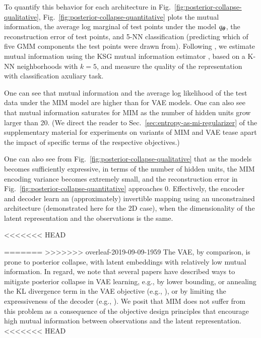 To quantify this behavior for each architecture in  
Fig.\ \ref{fig:posterior-collapse-qualitative}, Fig.\ 
\ref{fig:posterior-collapse-quantitative} plots the mutual information, 
the average log marginal of test points under the model $q_{{\boldsymbol \theta}}$,
the reconstruction error of test points, and 5-NN classification
(predicting which of five GMM components the test points were drawn from).
Following  \cite{Hjelm2018}, we estimate mutual information 
using the KSG mutual information estimator \cite{PhysRevE.69.066138,DBLP:journals/corr/GaoOV16},  
based on a K-NN neighborhoods with $k=5$, and measure the quality of the representation with classification axuliary task.

One can see that mutual information and the average log likelihood 
of the test data under the MIM model are higher than for VAE models.
One can also see that mutual information saturates for MIM as the
number of hidden units grow larger than 20.
(We direct the reader to Sec.\ \ref{sec:entropy-as-mi-regularizer}
of the supplementary material for experiments on variants of 
MIM and VAE tease apart the impact of specific terms of the 
respective objectives.)

One can also see from Fig.\ \ref{fig:posterior-collapse-qualitative} that as the models 
becomes sufficiently expressive, in terms of the number of 
hidden units, the MIM encoding variance becomes extremely small,
and the reconstruction error in Fig.\ \ref{fig:posterior-collapse-quantitative} approaches 0.
Effectively, the encoder and decoder learn an (approximately) invertible mapping using 
an unconstrained architecture (demonstrated here for the 2D case), when the 
dimensionality of the latent representation and the observations is the same.

<<<<<<< HEAD

=======
>>>>>>> overleaf-2019-09-09-1959
The VAE, by comparison, is prone to posterior collapse, with latent embeddings 
with relatively low mutual information. In regard, we note that several 
papers have described ways to mitigate posterior collapse in VAE learning, e.g., 
by lower bounding, or annealing the KL divergence term in the VAE objective 
(e.g., \citep{DBLP:journals/corr/abs-1711-00464,DBLP:journals/corr/abs-1901-03416}), 
or by limiting the expressiveness of the decoder (e.g., \citep{ChenKSDDSSA16}).
We posit that MIM does not suffer from this problem as a consequence of 
the objective design principles that encourage high mutual information
between observations and the latent representation.
<<<<<<< HEAD


